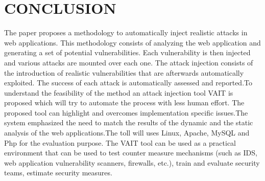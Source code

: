 \chapter{CONCLUSION}\label{chp:chapter5}
\thispagestyle{fancy}
The paper proposes a  methodology to automatically
inject realistic attacks in web applications. This methodology consists of analyzing the web application and generating a set of potential vulnerabilities. Each vulnerability is
then injected and various attacks are mounted over each
one. The attack injection consists of the introduction of realistic vulnerabilities that are afterwards automatically exploited. The success of each attack is automatically assessed
and reported.To understand the feasibility of the method an attack injection tool VAIT is proposed which will try to automate the process with less human effort.
The proposed tool can highlight and overcomes implementation specific issues.The system emphasized the need to match the results of the dynamic and the static analysis of the web applications.The toll will uses Linux, Apache, MySQL and Php for the evaluation purpose.
The VAIT tool can be used as a practical environment that can be used to test
counter measure mechanisms (such as IDS, web application vulnerability scanners, firewalls, etc.), train and evaluate security teams, estimate security measures.